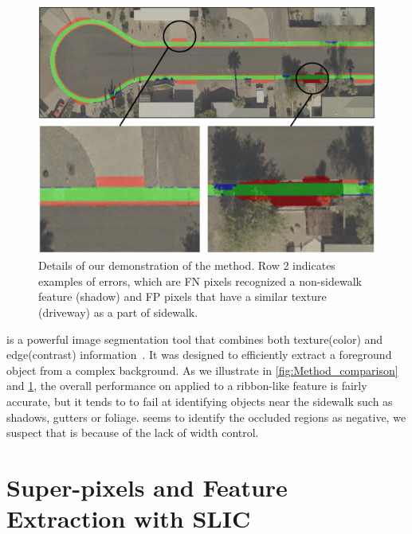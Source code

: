 \begin{figure}[H]
\centering 
\includegraphics[width=\textwidth]{Figures/grabcut_sample.png} 
\caption[Example of \GrabCut{}]{
Details of our demonstration of the \GrabCut{} method. Row 2 indicates examples of errors, which are
\ac{FN} pixels recognized a non-sidewalk feature (shadow) and \ac{FP} pixels that have a similar
texture (driveway) as a part of sidewalk.}
\label{fig:grabcut}
\end{figure}

\GrabCut{} is a powerful image segmentation tool that combines both texture(color) and edge(contrast) information~\cite{Rother2004-ou}. 
It was designed to efficiently extract a foreground object from a complex background. 
As we illustrate in \figurename{} \ref{fig:Method_comparison} and \figurename{} \ref{fig:grabcut}, the overall
 performance on \GrabCut{} applied to a ribbon-like feature is fairly accurate, but it tends to to fail at identifying objects near the 
 sidewalk such as shadows, gutters or foliage. 
\GrabCut{} seems to identify the occluded regions as negative, we suspect that is because of the lack of width control.

\section {Super-pixels and Feature Extraction with SLIC}

